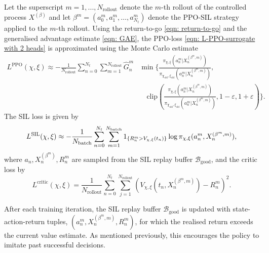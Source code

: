 Let the superscript $m=1,...,N_\text{rollout}$ denote the $m$-th rollout of the controlled process $X^{(\beta)}$ and let $\beta^m=(a_0^m, a_1^m, \ldots, a_{N_t}^m)$ denote the PPO-SIL strategy applied to the $m$-th rollout. Using the return-to-go \eqref{eqn: return-to-go} and the generalised advantage estimate \eqref{eqn: GAE}, the PPO-loss \eqref{eqn: L-PPO-surrogate with 2 heads} is approximated using the Monte Carlo estimate
\begin{align}
    L^{\text{PPO}}(\chi, \xi) \approx-\frac{1}{N_{\text{rollout}}} \sum_{n=0}^{N_t}\sum_{m=1}^{N_{\text{rollout}}} \hat G_n^m & \min \Bigg\{ \frac{\pi_{\chi, \xi}(a_n^m | X^{(\beta^m,m)}_n)}{\pi_{\chi_\text{old}, \xi_\text{old}}(a_n^m |X^{(\beta^m,m)}_n)}, \nonumber \\ 
    & \quad \text{clip}\left( \frac{\pi_{\chi, \xi}(a_n^m | X^{(\beta^m,m)}_n)}{\pi_{\chi_\text{old}, \xi_\text{old}}(a_n^m |X^{(\beta^m,m)}_n)}, 1-\varepsilon, 1+\varepsilon \right)\Bigg\}.
    \label{eqn: L-PPO approximate}
\end{align}
The SIL loss is given by
\begin{equation}
    L^{\text{SIL}}(\chi,\xi) \approx -\frac{1}{N_{\text{batch}}} \sum_{n=0}^{N_t}\sum_{m=1}^{N_{\text{batch}}} 1_{\left\{R_n^m > V_{\chi,\xi}(t_n)\right\}} \log \pi_{\chi, \xi}(a_n^m, X^{(\beta^m,m)}_n),
    \label{eqn: L-SIL approximate}
\end{equation}
where $a_n,X_n^{(\beta^m)},R_n^m$ are sampled from the SIL replay buffer $\mathcal{B}_{\text{good}}$, and the critic loss by
\begin{equation}
    L^{\text{critic}}(\chi,\xi) = \frac{1}{N_{\text{rollout}}} \sum_{n=0}^{N_t} \sum_{j=1}^{N_{\text{rollout}}} \left(V_{\chi,\xi}(t_n,X_n^{(\beta^m,m)}) - R_n^m\right)^2.
    \label{eqn: L-critic approximate}
\end{equation}

After each training iteration, the SIL replay buffer $\mathcal{B}_{\text{good}}$ is updated with state-action-return tuples, $(a_n^m,X_n^{(\beta^m,m)},R_n^m)$, for which the realised return exceeds the current value estimate. As mentioned previously, this encourages the policy to imitate past successful decisions.

